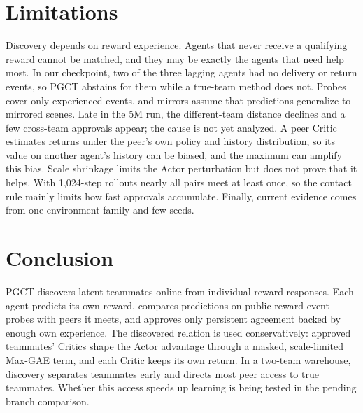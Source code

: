 \documentclass{article}
\begin{document}
\section{Limitations}
Discovery depends on reward experience. Agents that never receive a qualifying reward cannot be matched, and they may be exactly the agents that need help most. In our checkpoint, two of the three lagging agents had no delivery or return events, so PGCT abstains for them while a true-team method does not. Probes cover only experienced events, and mirrors assume that predictions generalize to mirrored scenes. Late in the 5M run, the different-team distance declines and a few cross-team approvals appear; the cause is not yet analyzed. A peer Critic estimates returns under the peer's own policy and history distribution, so its value on another agent's history can be biased, and the maximum can amplify this bias. Scale shrinkage limits the Actor perturbation but does not prove that it helps. With 1{,}024-step rollouts nearly all pairs meet at least once, so the contact rule mainly limits how fast approvals accumulate. Finally, current evidence comes from one environment family and few seeds.

\section{Conclusion}
PGCT discovers latent teammates online from individual reward responses. Each agent predicts its own reward, compares predictions on public reward-event probes with peers it meets, and approves only persistent agreement backed by enough own experience. The discovered relation is used conservatively: approved teammates' Critics shape the Actor advantage through a masked, scale-limited Max-GAE term, and each Critic keeps its own return. In a two-team warehouse, discovery separates teammates early and directs most peer access to true teammates. Whether this access speeds up learning is being tested in the pending branch comparison.



\end{document}

